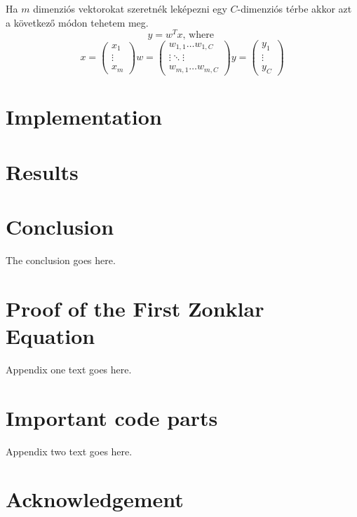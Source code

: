 \documentclass[journal]{IEEEtran}
\begin{document}
Ha $ m $ dimenziós vektorokat szeretnék leképezni egy $ C $-dimenziós térbe akkor azt a következő módon tehetem meg.
\begin{equation}
y = w^Tx \textrm{, where } 
\end{equation}
\begin{equation}
x = \left(
\begin{array}{ccc}
x_1\\
\vdots\\
x_m
\end{array} \right)
w=\left(
\begin{array}{ccc}
w_{1,1} \dots w_{1,C}\\
\vdots \ddots \vdots\\
w_{m,1} \dots w_{m,C}
\end{array}
\right)
y = \left(
\begin{array}{ccc}
y_1\\
\vdots\\
y_C
\end{array}\right)
\label{equ:Alap_egyenlet}
\end{equation}

\section {Implementation}

\section{Results}

\section{Conclusion}
The conclusion goes here.


\appendices
\section{Proof of the First Zonklar Equation}
Appendix one text goes here.

\section{Important code parts}
Appendix two text goes here.


\section*{Acknowledgement}
\end{document}
